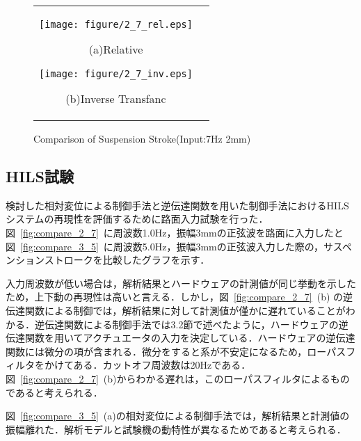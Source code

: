 \documentclass[a4paper,12pt]{article_vdlab_sotsuron}
\begin{document}
\begin{figure}[h]
  \begin{tabular}{cc}
  \begin{minipage}{0.5\hsize}
  \begin{center}
    \texttt{[image: figure/2\_7\_rel.eps]}
    \end{center}
    \begin{center}
    \ (a)Relative\
    \end{center}
  \end{minipage}
  \begin{minipage}{0.5\hsize}
     \begin{center}
      \texttt{[image: figure/2\_7\_inv.eps]}
      \end{center}
      \begin{center}
      \ (b)Inverse Transfanc\
    \end{center}
  \end{minipage}
  \end{tabular}
  \vspace*{3mm}
  \caption{Comparison of Suspension Stroke(Input:7Hz 2mm)}
    \label{fig:sim_2_7}
\end{figure}

\newpage
\subsection{HILS試験}
検討した相対変位による制御手法と逆伝達関数を用いた制御手法におけるHILSシステムの再現性を評価するために路面入力試験を行った．図~\ref{fig:compare_2_7}~に周波数1.0Hz，振幅3mmの正弦波を路面に入力したと図~\ref{fig:compare_3_5}~に周波数5.0Hz，振幅3mmの正弦波入力した際の，サスペンションストロークを比較したグラフを示す．
\par
入力周波数が低い場合は，解析結果とハードウェアの計測値が同じ挙動を示したため，上下動の再現性は高いと言える．しかし，図~\ref{fig:compare_2_7}~(b) の逆伝達関数による制御では，解析結果に対して計測値が僅かに遅れていることがわかる．逆伝達関数による制御手法では3.2節で述べたように，ハードウェアの逆伝達関数を用いてアクチュエータの入力を決定している．ハードウェアの逆伝達関数には微分の項が含まれる．微分をすると系が不安定になるため，ローパスフィルタをかけてある．カットオフ周波数は20Hzである．図~\ref{fig:compare_2_7}~(b)からわかる遅れは，このローパスフィルタによるものであると考えられる．
\par
図~\ref{fig:compare_3_5}~(a)の相対変位による制御手法では，解析結果と計測値の振幅離れた．解析モデルと試験機の動特性が異なるためであると考えられる．
\end{document}
